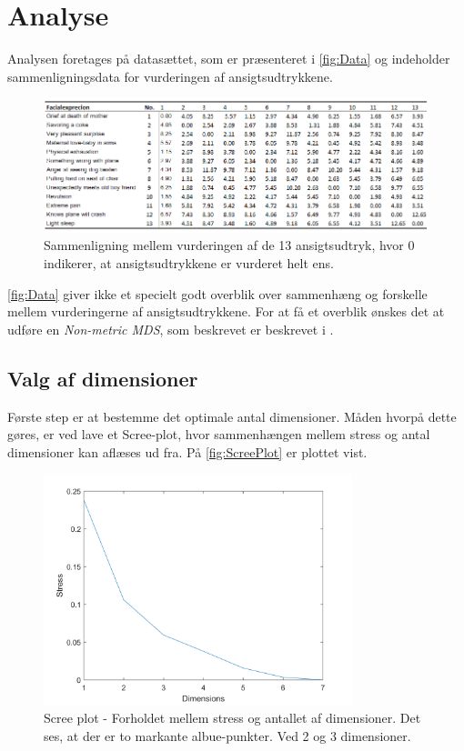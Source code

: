 \section*{Analyse}
\label{Analyse}
%
Analysen foretages på datasættet, som er præsenteret i \autoref{fig:Data} og indeholder sammenligningsdata for vurderingen af ansigtsudtrykkene. 

\begin{figure}[H]
\centering
\includegraphics[width = \textwidth]{Figure/Data.PNG} 
\caption{Sammenligning mellem vurderingen af de 13 ansigtsudtryk, hvor 0 indikerer, at ansigtsudtrykkene er vurderet helt ens.}
\label{fig:Data}
\end{figure}

\noindent \autoref{fig:Data} giver ikke et specielt godt overblik over sammenhæng og forskelle mellem vurderingerne af ansigtsudtrykkene. For at få et overblik ønskes det at udføre en \textit{Non-metric MDS}, som beskrevet er beskrevet i . 

\subsection*{Valg af dimensioner}
Første step er at bestemme det optimale antal dimensioner. Måden hvorpå dette gøres, er ved lave et Scree-plot, hvor sammenhængen mellem stress og antal dimensioner kan aflæses ud fra. På \autoref{fig:ScreePlot} er plottet vist. 

\begin{figure}[H]
\centering
\includegraphics[width = 0.8\textwidth]{Figure/screeplot.png} 
\caption{Scree plot - Forholdet mellem stress og antallet af dimensioner. Det ses, at der er to markante albue-punkter. Ved 2 og 3 dimensioner.}
\label{fig:ScreePlot}
\end{figure}

